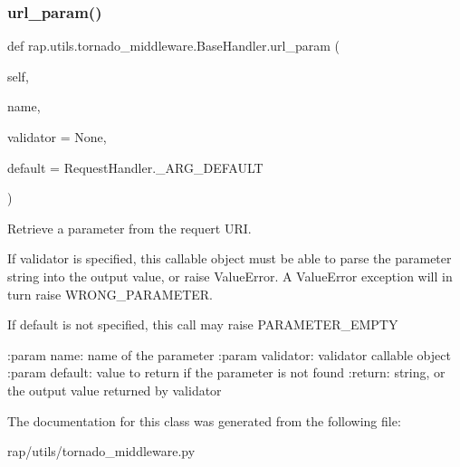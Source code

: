 \subsubsection{\texorpdfstring{url\+\_\+param()}{url\_param()}}
{\footnotesize\ttfamily def rap.\+utils.\+tornado\+\_\+middleware.\+Base\+Handler.\+url\+\_\+param (\begin{DoxyParamCaption}\item[{}]{self,  }\item[{}]{name,  }\item[{}]{validator = {\ttfamily None},  }\item[{}]{default = {\ttfamily RequestHandler.\+\_\+ARG\+\_\+DEFAULT} }\end{DoxyParamCaption})}

\begin{DoxyVerb}Retrieve a parameter from the requert URI.

If validator is specified, this callable object must be able to parse the parameter string into
the output value, or raise ValueError. A ValueError exception will in turn raise WRONG_PARAMETER.

If default is not specified, this call may raise PARAMETER_EMPTY

:param name: name of the parameter
:param validator: validator callable object
:param default: value to return if the parameter is not found
:return: string, or the output value returned by validator
\end{DoxyVerb}
 

The documentation for this class was generated from the following file\+:\begin{DoxyCompactItemize}
\item 
rap/utils/tornado\+\_\+middleware.\+py\end{DoxyCompactItemize}
